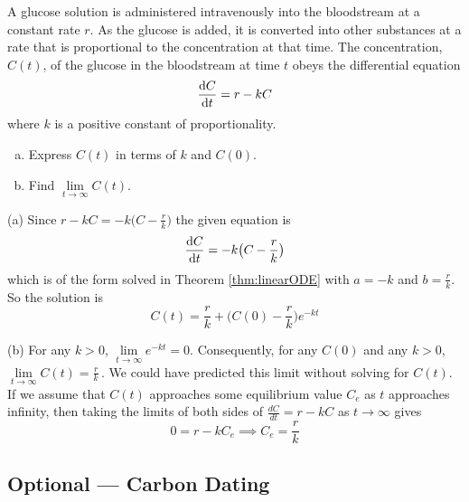 \goodbreak
\begin{eg}\label{eg:SDEgluclose}
A glucose solution is administered
intravenously into the bloodstream at a constant rate $r$. As the glucose
is added, it is converted into other substances at a rate that is proportional
to the concentration at that time. The concentration, $C(t)$, of the glucose
in the bloodstream at time $t$ obeys the differential equation
$$
\diff{C}{t}=r-kC
$$
where $k$ is a positive constant of proportionality.
\begin{enumerate}[(a)]
\item Express $C(t)$ in terms of $k$ and $C(0)$.
\item Find $\lim\limits_{t\rightarrow\infty} C(t)$.
\end{enumerate}

\soln (a) Since $r-kC=-k\big(C-\frac{r}{k}\big)$ the given equation is
\begin{equation*}
\diff{C}{t}=-k\big(C-\frac{r}{k}\big)
\end{equation*}
which is of the form solved in Theorem \ref{thm:linearODE}
with $a=-k$ and $b=\frac{r}{k}$. So the solution is
\begin{equation*}
C(t)=\frac{r}{k}+\Big(C(0)-\frac{r}{k}\Big)e^{-kt}
\end{equation*}

\noindent(b) For any $k>0$, $\lim\limits_{t\rightarrow\infty} e^{-kt}=0$.
Consequently, for any $C(0)$ and any $k>0$,
\hbox{$\lim\limits_{t\rightarrow\infty} C(t)=\frac{r}{k}$}$\,$.
We could have predicted this limit without solving for $C(t)$. If we
assume that $C(t)$ approaches some equilibrium value $C_e$ as $t$ approaches
infinity, then taking the limits of both sides of $\frac{dC}{dt}=r-kC$
as $t\rightarrow\infty$ gives
\begin{equation*}
0=r-kC_e\implies C_e=\frac{r}{k}
\end{equation*}
\end{eg}

\subsection{Optional --- Carbon Dating}

